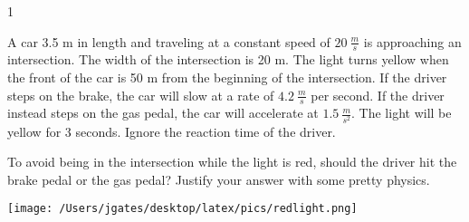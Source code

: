 
\AddToShipoutPicture*{\BackgroundPic}

\addtocounter {ProbNum} {1}

 
{\bf \Large{}} A car 3.5 m in length and traveling at a constant speed of ${20~\tfrac{m}{s}}$ is approaching an intersection. The width of the intersection is 20 m. The light turns yellow when the front of the car is 50 m from the beginning of the intersection. If the driver steps on the brake, the car will slow at a rate of ${4.2~\tfrac{m}{s}}$ per second. If the driver instead steps on the gas pedal, the car will accelerate at ${1.5~\tfrac{m}{s^2}}$. The light will be yellow for 3 seconds. Ignore the reaction time of the driver. 

\bigskip
To avoid being in the intersection while the light is red, should the driver hit the brake pedal or the gas pedal? Justify your answer with some pretty physics.

\hfill \texttt{[image: /Users/jgates/desktop/latex/pics/redlight.png]}


\vfill
\newpage
